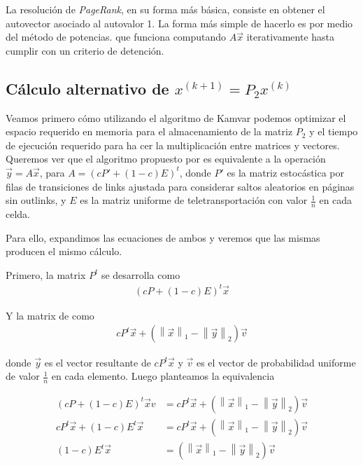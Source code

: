 La resolución de \textit{PageRank}, en su forma más básica, consiste en obtener el autovector 
asociado al autovalor 1. La forma más simple de hacerlo es por medio del método de potencias.
que funciona computando $A\vec{x}$ iterativamente hasta cumplir con un criterio de detención.

\subsection{Cálculo alternativo de $x^{(k + 1)} = P_2x^{(k)}$}

Veamos primero cómo utilizando el algoritmo de Kamvar podemos optimizar el espacio requerido
en memoria para el almacenamiento de la matriz $P_2$ y el tiempo de ejecución requerido para ha
cer la multiplicación entre matrices y vectores.\\

\newcommand{\vectornorm}[1]{\left\|#1\right\|}
Queremos ver que el algoritmo propuesto por \cite[Algoritmo 1]{Kamvar2003} es equivalente
a la operación $\vec{y} = A\vec{x}$, para $A=(cP' + (1-c)E)^{t}$, donde $P'$ es la matriz 
estocástica por filas de transiciones de links ajustada para considerar saltos aleatorios
en páginas sin outlinks, y $E$ es la matriz uniforme de teletransportación con valor $\frac{1}{n}$ en cada celda.

Para ello, expandimos las ecuaciones de ambos y veremos que las mismas producen el mismo cálculo.

Primero, la matrix $P^{t}$ se desarrolla como 
\begin{align*}
(cP + (1 - c)E)^{t} \vec{x}
\end{align*}

Y la matrix de \cite[Algoritmo 1]{Kamvar 2003} como
\begin{align*}
cP^{t}\vec{x} + (\vectornorm{\vec{x}}_1 - \vectornorm{\vec{y}}_2)\vec{v}
\end{align*}

donde $\vec{y}$ es el vector resultante de $cP^{t}\vec{x}$ y $\vec{v}$ es el vector de probabilidad
uniforme de valor $\frac{1}{n}$ en cada elemento. Luego planteamos la equivalencia

\begin{align*}
(cP + (1-c)E)^{t} \vec{x} v&= cP^{t}\vec{x} + (\vectornorm{\vec{x}}_1 - \vectornorm{\vec{y}}_2)\vec{v} \\
cP^{t}\vec{x} + (1-c)E^{t}\vec{x} &= cP^{t}\vec{x} + (\vectornorm{\vec{x}}_1 - \vectornorm{\vec{y}}_2)\vec{v} \\
(1-c)E^{t}\vec{x} &= (\vectornorm{\vec{x}}_1 - \vectornorm{\vec{y}}_2)\vec{v}
\end{align*}

